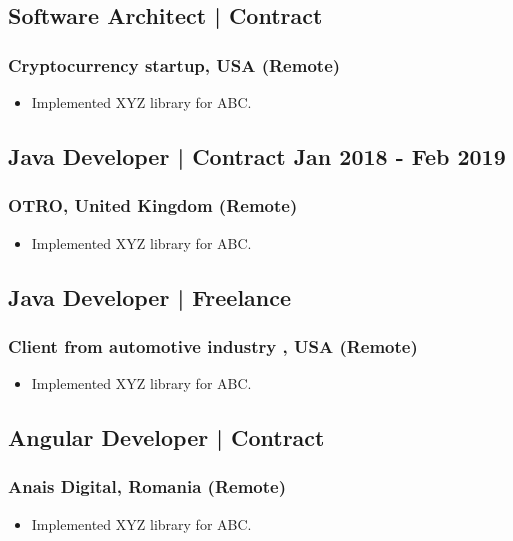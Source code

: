 \documentclass[11pt]{article}
\begin{document}
    \subsection{Software Architect | Contract \hfill {}}
    \subsubsection{Cryptocurrency startup, USA (Remote)}
    \begin{itemize}
        \item[\checkmark]  Implemented XYZ library for ABC.
    \end{itemize}
    
    \subsection{Java Developer | Contract \hfill \normalfont Jan 2018 - Feb 2019}
    \subsubsection{OTRO, United Kingdom (Remote)}
    \begin{itemize}
        \item[\checkmark]  Implemented XYZ library for ABC.
    \end{itemize}
    
    \subsection{Java Developer | Freelance \hfill {}}
    \subsubsection{Client from automotive industry , USA (Remote)}
    \begin{itemize}
        \item[\checkmark]  Implemented XYZ library for ABC.
    \end{itemize}
    
    \subsection{Angular Developer | Contract \hfill {}}
    \subsubsection{Anais Digital, Romania (Remote)}
    \begin{itemize}
        \item[\checkmark]  Implemented XYZ library for ABC.
    \end{itemize}
    
\end{document}
